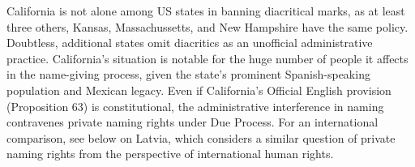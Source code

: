 California is not alone among US states in banning diacritical marks, as at
least three others, Kansas, Massachussetts, and New Hampshire have the same
policy. Doubtless, additional states omit diacritics as an unofficial
administrative practice. California's situation is notable for the huge number
of people it affects in the name-giving process, given the state's prominent
Spanish-speaking population and Mexican legacy. Even if California's Official
English provision (Proposition 63) is constitutional, the administrative
interference in naming contravenes private naming rights under Due Process. For
an international comparison, see below on Latvia, which considers a similar
question of private naming rights from the perspective of international human
rights.
